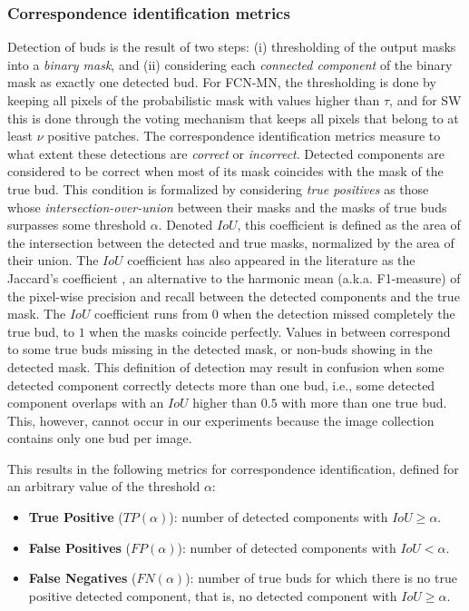 \documentclass[a4paper,authoryear,review]{elsarticle}
\begin{document}
\subsubsection{Correspondence identification metrics}
\label{subsec:detectmetrics}

Detection of buds is the result of two steps: (i) thresholding of the output masks into a \emph{binary mask}, and (ii) considering each \emph{connected component} of the binary mask as exactly one detected bud. For FCN-MN, the thresholding is done by keeping all pixels of the probabilistic mask with values higher than $\tau$, and for SW this is done through the voting mechanism that keeps all pixels that belong to at least $\nu$ positive patches.
%
The correspondence identification metrics measure to what extent these detections are \emph{correct} or \emph{incorrect}. Detected components are considered to be correct when most of its mask coincides with the mask of the true bud. This condition is formalized by considering \emph{true positives} as those whose \emph{intersection-over-union} between their masks and the masks of true buds surpasses some threshold $\alpha$. Denoted $IoU$, this coefficient is defined as the area of the intersection between the detected and true masks, normalized by the area of their union. The $IoU$ coefficient  has also appeared in the literature as the Jaccard’s coefficient \citep{jaccard1912distribution}, an alternative to the harmonic mean (a.k.a. F1-measure) of the pixel-wise precision and recall between the detected components and the true mask. The $IoU$ coefficient runs from $0$ when the detection missed completely the true bud, to $1$ when the masks coincide perfectly. Values in between correspond to some true buds missing in the detected mask, or non-buds showing in the detected mask. 
%
This definition of detection may result in confusion when some detected component correctly detects more than one bud, i.e., some detected component overlaps with an $IoU$ higher than $0.5$ with more than one true bud. This, however, cannot occur in our experiments because the image collection contains only one bud per image. 

This results in the following metrics for correspondence identification, defined for an arbitrary value of the threshold $\alpha$:

\begin{itemize}
\item \textbf{True Positive} ($TP(\alpha)$): number of detected components with $ IoU \geq \alpha $.

\item \textbf{False Positives} ($FP(\alpha)$): number of detected components with $IoU < \alpha$.

\item \textbf{False Negatives} ($FN(\alpha)$):  number of true buds for which there is no true positive detected component, that is, no detected component with $IoU \geq \alpha$. 

\end{itemize}
\end{document}
